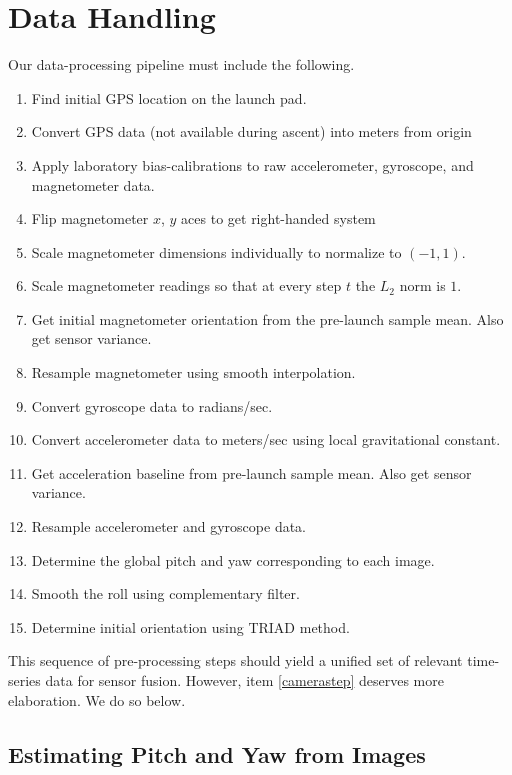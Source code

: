 \documentclass{article}
\begin{document}
\section{Data Handling} \label{sec:data}
Our data-processing pipeline must include the following.
\begin{enumerate}
    \item Find initial GPS location on the launch pad.
    \item Convert GPS data (not available during ascent) into meters from origin
    \item Apply laboratory bias-calibrations to raw accelerometer, gyroscope, and magnetometer data.
    \item Flip magnetometer $x$, $y$ aces to get right-handed system
    \item Scale magnetometer dimensions individually to normalize to $(-1, 1)$.
    \item Scale magnetometer readings so that at every step $t$ the $L_2$ norm is $1$.
    \item Get initial magnetometer orientation from the pre-launch sample mean. Also get sensor variance.
    \item Resample magnetometer using smooth interpolation.
    \item Convert gyroscope data to radians/sec.
    \item Convert accelerometer data to meters/sec using local gravitational constant.
    \item Get acceleration baseline from pre-launch sample mean. Also get sensor variance.
    \item Resample accelerometer and gyroscope data.
    \item \label{camerastep}Determine the global pitch and yaw corresponding to each image.
    \item Smooth the roll using complementary filter.
    \item Determine initial orientation using TRIAD method.
\end{enumerate}
This sequence of pre-processing steps should yield a unified set of relevant time-series data for sensor fusion. However, item \ref{camerastep} deserves more elaboration. We do so below. 

\subsection{Estimating Pitch and Yaw from Images}
\end{document}
